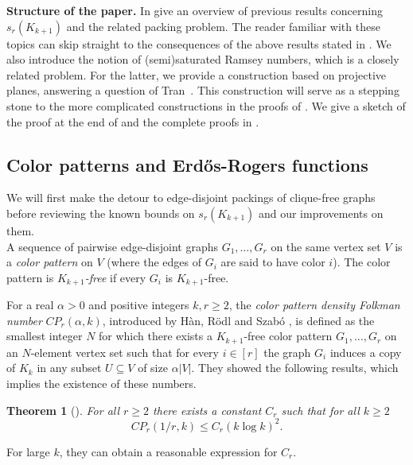 \documentclass[12pt]{article}
\newtheorem{theorem}{Theorem}
\theoremstyle{definition}
\begin{document}
	\textbf{Structure of the paper.} In  give an overview of previous results concerning $s_r(K_{k+1})$ and the related packing problem. The reader familiar with these topics can skip straight to the consequences of the above results stated in . We also introduce the notion of (semi)saturated Ramsey numbers, which is a closely related problem. For the latter, we provide a construction based on projective planes, answering a question of Tran~\cite{tran2022two}. This construction will serve as a stepping stone to the more complicated constructions in the proofs of . We give a sketch of the proof at the end of  and the complete proofs in .
	
	\subsection{Color patterns and Erd\H{o}s-Rogers functions} \label{subsec:folkman}
	
	We will first make the detour to edge-disjoint packings of clique-free graphs before reviewing the known bounds on $s_r(K_{k+1})$ and our improvements on them. \\
	
	A sequence of pairwise edge-disjoint graphs $G_1,\dots,G_r$ on the same vertex set $V$ is a \textit{color pattern} on $V$ (where the edges of $G_i$ are said to have color $i$). The color pattern is \textit{$K_{k+1}$-free} if every $G_i$ is $K_{k+1}$-free.
	
	For a real $\alpha > 0$ and positive integers $k,r \geq 2$, the \textit{color pattern density Folkman number} $CP_r(\alpha,k)$, introduced by Hàn, R\"odl and Szab\'o \cite{han}, is defined as the smallest integer $N$ for which there exists a $K_{k+1}$-free color pattern $G_1,\dots,G_r$ on an $N$-element vertex set such that for every $i \in [r]$ the graph $G_i$ induces a copy of $K_k$ in any subset $U \subseteq V$ of size $\alpha|V|$. They showed the following results, which implies the existence of these numbers.
	
	\begin{theorem}[\cite{han}]\label{thm:HRS2}
		For all $r \geq 2$ there exists a constant $C_r$ such that for all $k \geq 2$
		\[CP_r(1/r,k) \leq C_r(k\log k)^2.\]
	\end{theorem}
	
	For large $k$, they can obtain a reasonable expression for $C_r$.
	
\end{document}
